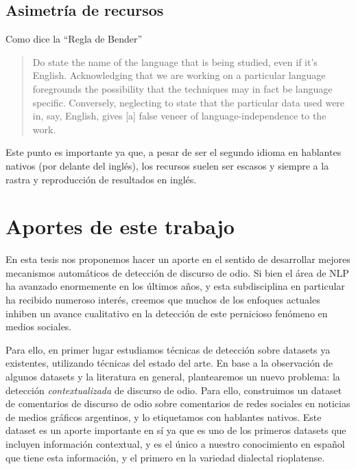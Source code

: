 \subsection{Asimetría de recursos}

Como dice la ``Regla de Bender''\cite{bender2011achieving}

\begin{quote}
    Do state the name of the language that is being studied, even if it's English. Acknowledging that we are working on a particular language foregrounds the possibility that the techniques may in fact be language specific. Conversely, neglecting to state that the particular data used were in, say, English, gives [a] false veneer of language-independence to the work.
\end{quote}

Este punto es importante ya que, a pesar de ser el segundo idioma en hablantes nativos (por delante del inglés), los recursos suelen ser escasos y siempre a la rastra y reproducción de resultados en inglés. 



\section{Aportes de este trabajo}

En esta tesis nos proponemos hacer un aporte en el sentido de desarrollar mejores mecanismos automáticos de detección de discurso de odio. Si bien el área de NLP ha avanzado enormemente en los últimos años, y esta subdisciplina en particular ha recibido numeroso interés, creemos que muchos de los enfoques actuales inhiben un avance cualitativo en la detección de este pernicioso fenómeno en medios sociales.

Para ello, en primer lugar estudiamos técnicas de detección sobre datasets ya existentes, utilizando técnicas del estado del arte. En base a la observación de algunos datasets y la literatura en general, plantearemos un nuevo problema: la detección \emph{contextualizada} de discurso de odio. Para ello, construimos un dataset de comentarios de discurso de odio sobre comentarios de redes sociales en noticias de medios gráficos argentinos, y lo etiquetamos con hablantes nativos. Este dataset es un aporte importante en sí ya que es uno de los primeros datasets que incluyen información contextual, y es el único a nuestro conocimiento en español que tiene esta información, y el primero en la variedad dialectal rioplatense. 

